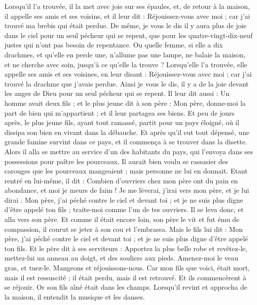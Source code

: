 \begin{multicols}{2}
Lorsqu’il l’a trouvée, il la met avec joie sur ses épaules,
et, de retour à la maison, il appelle ses amis et ses voisins, et il leur dit : Réjouissez-vous avec moi ; car j'ai trouvé ma brebis qui était perdue.
De même, je vous le dis il y aura plus de joie dans le ciel pour un seul pécheur qui se repent, que pour les quatre-vingt-dix-neuf justes qui n'ont pas besoin de repentance.
\TextTitle{[grandeur]}
Ou quelle femme, si elle a dix drachmes, et qu’elle en perde une, n'allume pas une lampe, ne balaie la maison, et ne cherche avec soin, jusqu'à ce qu'elle la trouve ?
Lorsqu’elle l’a trouvée, elle appelle ses amis et ses voisines, en leur disant : Réjouissez-vous avec moi ; car j'ai trouvé la drachme que j'avais perdue.
Ainsi je vous le dis, il y a de la joie devant les anges de Dieu pour un seul pécheur qui se repent.
\TextTitle{[grandeur]}
Il leur dit aussi : Un homme avait deux fils ;
et le plus jeune dit à son père : Mon père, donne-moi la part de bien qui m'appartient ; et il leur partagea ses biens.
Et peu de jours après, le plus jeune fils, ayant tout ramassé, partit pour un pays éloigné, où il dissipa son bien en vivant dans la débauche.
Et après qu'il eut tout dépensé, une grande famine survint dans ce pays, et il commença à se trouver dans la disette.
Alors il alla se mettre au service d'un des habitants du pays, qui l'envoya dans ses possessions pour paître les pourceaux.
Il aurait bien voulu se rassasier des carouges que les pourceaux mangeaient ; mais personne ne lui en donnait.
Etant rentré en lui-même, il dit : Combien d’ouvriers chez mon père ont du pain en abondance, et moi je meurs de faim !
Je me lèverai, j’irai vers mon père, et je lui dirai : Mon père, j'ai péché contre le ciel et devant toi ;
et je ne suis plus digne d'être appelé ton fils ; traite-moi comme l'un de tes ouvriers.
Il se leva donc, et alla vers son père. Et comme il était encore loin, son père le vit et fut ému de compassion, il courut se jeter à son cou et l’embrassa.
Mais le fils lui dit : Mon père, j'ai péché contre le ciel et devant toi ; et je ne suis plus digne d'être appelé ton fils.
Et le père dit à ses serviteurs : Apportez la plus belle robe et revêtez-le, mettez-lui un anneau au doigt, et des souliers aux pieds.
Amenez-moi le veau gras, et tuez-le. Mangeons et réjouissons-nous.
Car mon fils que voici, était mort, mais il est ressuscité ; il était perdu, mais il est retrouvé. Et ils commencèrent à se réjouir.
Or son fils aîné était dans les champs. Lorsqu’il revint et approcha de la maison, il entendit la musique et les danses.

\end{multicols}
